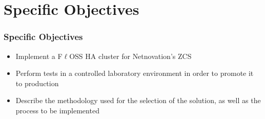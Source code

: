 \section{Specific Objectives}

\begin{frame}
\frametitle{Specific Objectives}

\begin{itemize}
  \item Implement a F$\ell$OSS HA cluster for Netnovation's ZCS
  
  \vspace{0.2cm}
  
  \item Perform tests in a controlled laboratory environment in order to promote it to production
  
  \vspace{0.2cm}
  
  \item Describe the methodology used for the selection of the solution, as well as the process to be implemented
\end{itemize}

\end{frame}